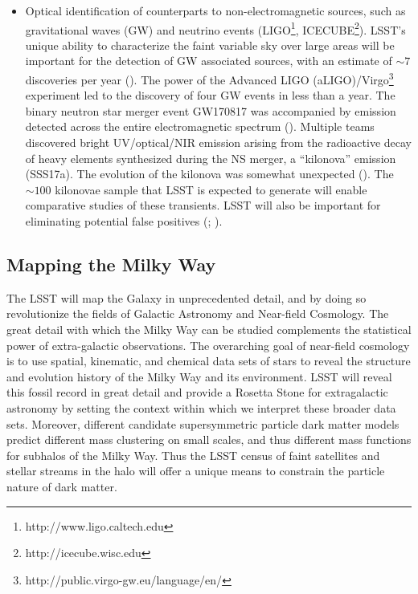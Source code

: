 \begin{itemize}
\item Optical identification of counterparts to non-electromagnetic
  sources, such as gravitational waves (GW) and neutrino events
  (LIGO\footnote{http://www.ligo.caltech.edu},
  ICECUBE\footnote{http://icecube.wisc.edu}).  LSST's unique ability
  to characterize the faint variable sky over large areas will be
  important for the detection of GW associated sources, with an estimate
  of $\sim 7$ discoveries per year (\cite{Scolnic2017}).  The power
  of the Advanced LIGO (aLIGO)/Virgo\footnote{http://public.virgo-gw.eu/language/en/} experiment led to the discovery
  of four GW events in less than a year. The binary
  neutron star merger event GW170817 was accompanied by emission
  detected across the entire electromagnetic spectrum (\cite{Abbott2017}).
  Multiple teams discovered bright UV/optical/NIR emission
  arising from the radioactive decay of heavy elements synthesized
  during the NS merger, a ``kilonova'' emission (SSS17a).  The
  evolution of the kilonova was somewhat unexpected (\cite{Abbott2017}).
  The ${\sim100}$ kilonovae sample that LSST is expected to
  generate will enable comparative studies of these transients. LSST
  will also be important for eliminating potential false positives
  (\cite{Nissanke2013}; \cite{Metzger2012}).

\end{itemize}


\subsection{Mapping the Milky Way }

The LSST will map the Galaxy in unprecedented detail, and by doing so revolutionize the fields of Galactic
Astronomy and Near-field Cosmology. The great detail with which the Milky Way can be studied complements
the statistical power of extra-galactic observations.  The overarching goal of near-field cosmology is to use
spatial, kinematic, and chemical data sets of stars to reveal the structure and evolution history of the Milky Way
and its environment. LSST will reveal this fossil record in great detail and provide a Rosetta Stone for extragalactic
astronomy by setting the context within which we interpret these
broader data sets. Moreover, different candidate supersymmetric
particle dark matter models predict different mass clustering on small
scales, and thus different mass functions for subhalos of the Milky
Way.  Thus the LSST census of faint satellites and stellar streams in
the halo will offer a unique means to constrain the
particle nature of dark matter.


